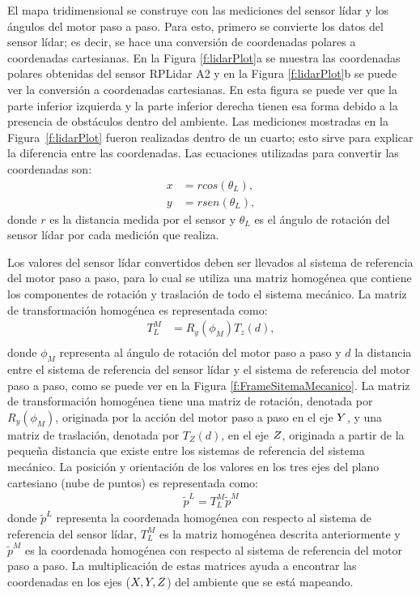 El mapa tridimensional se construye con las mediciones del sensor lídar y los ángulos del motor 
paso a paso. Para esto, primero se convierte los datos del sensor lídar; es decir, se hace una 
conversión de coordenadas polares a coordenadas cartesianas. En la Figura \ref{f:lidarPlot}a 
se muestra las coordenadas polares obtenidas del sensor RPLidar A2 y en la Figura 
\ref{f:lidarPlot}b se puede ver la conversión a coordenadas cartesianas. En esta figura se 
puede ver que la parte inferior izquierda y la parte inferior derecha tienen esa forma 
debido a la presencia de obstáculos dentro del ambiente. Las mediciones 
mostradas en la Figura~\ref{f:lidarPlot} fueron realizadas dentro de un cuarto; esto sirve 
para explicar la diferencia entre las coordenadas. Las ecuaciones utilizadas para convertir 
las coordenadas son:
\begin{align*}
	x &= rcos(\theta_{L}), \\
	y &= rsen(\theta_{L}),
\end{align*}
donde $r$ es la distancia medida por el sensor y $\theta_{L}$ es el ángulo de rotación 
del sensor lídar por cada medición que realiza.

Los valores del sensor lídar convertidos deben ser llevados al sistema de referencia del 
motor paso a paso, para lo cual se utiliza una matriz homogénea que contiene los 
componentes de rotación y traslación de todo el sistema mecánico. La matriz de 
transformación homogénea es representada como:
\begin{align*}
	T_{L}^{M} &= R_{y}(\phi_{M}) T_{z}(d), \\
\end{align*}
donde $\phi_{M}$ representa al ángulo de rotación del motor paso a paso y $d$  la distancia entre el 
sistema de referencia del sensor lídar y el sistema de referencia del motor paso a paso, como se 
puede ver en la Figura \ref{f:FrameSitemaMecanico}. La matriz  de transformación homogénea
tiene una matriz de rotación, denotada por $R_{y}(\phi_{M})$, originada por la acción del 
motor paso a paso en el eje $\mathnormal Y$, y una matriz de traslación, denotada por $T_{Z}(d)$, en el 
eje $\mathnormal Z$, originada a partir de la pequeña distancia que existe entre los sistemas de referencia 
del sistema mecánico. La posición y orientación de los valores en los tres ejes del plano
cartesiano (nube de puntos) es representada como:
\begin{align}
	\tilde{p}^{L} = T_{L}^{M} \tilde{p}^{M}
	\label{eqn:MatrizHomogenea}
\end{align}
donde $\tilde{p}^{L}$ representa la coordenada homogénea con respecto al sistema de referencia del sensor
lídar, $T_{L}^{M}$ es la matriz homogénea descrita anteriormente y $\tilde{p}^{M}$ es la coordenada 
homogénea con respecto al sistema de referencia del motor paso a paso. La multiplicación de estas matrices
ayuda a encontrar las coordenadas en los ejes ($\mathnormal X,\mathnormal Y,\mathnormal Z$) del ambiente
que se está mapeando.

